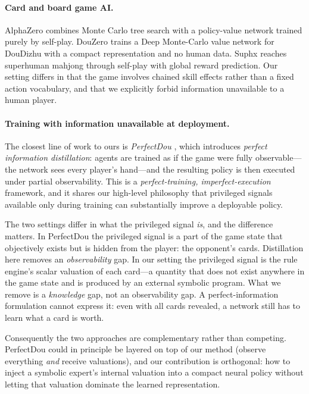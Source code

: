 \documentclass[11pt]{article}
\begin{document}
\paragraph{Card and board game AI.} AlphaZero \cite{silver2018} combines Monte Carlo tree search with a policy-value network trained purely by self-play. DouZero \cite{zha2021douzero} trains a Deep Monte-Carlo value network for DouDizhu with a compact representation and no human data. Suphx \cite{li2020suphx} reaches superhuman mahjong through self-play with global reward prediction. Our setting differs in that the game involves chained skill effects rather than a fixed action vocabulary, and that we explicitly forbid information unavailable to a human player.

\paragraph{Training with information unavailable at deployment.} The closest line of work to ours is \emph{PerfectDou} \cite{yang2022perfectdou}, which introduces \emph{perfect information distillation}: agents are trained as if the game were fully observable---the network sees every player's hand---and the resulting policy is then executed under partial observability. This is a \emph{perfect-training, imperfect-execution} framework, and it shares our high-level philosophy that privileged signals available only during training can substantially improve a deployable policy.

The two settings differ in what the privileged signal \emph{is}, and the difference matters. In PerfectDou the privileged signal is a part of the game state that objectively exists but is hidden from the player: the opponent's cards. Distillation here removes an \emph{observability} gap. In our setting the privileged signal is the rule engine's scalar valuation of each card---a quantity that does not exist anywhere in the game state and is produced by an external symbolic program. What we remove is a \emph{knowledge} gap, not an observability gap. A perfect-information formulation cannot express it: even with all cards revealed, a network still has to learn what a card is worth.

Consequently the two approaches are complementary rather than competing. PerfectDou could in principle be layered on top of our method (observe everything \emph{and} receive valuations), and our contribution is orthogonal: how to inject a symbolic expert's internal valuation into a compact neural policy without letting that valuation dominate the learned representation.
\end{document}
